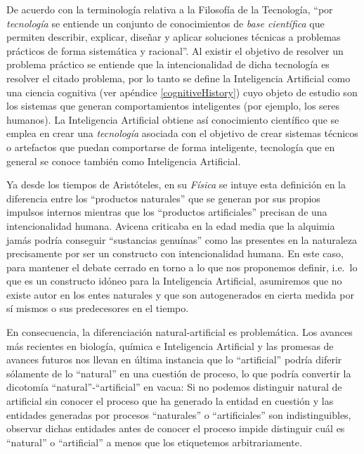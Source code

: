 \documentclass[12pt]{memoir}
\begin{document}
De acuerdo con la terminología relativa a la Filosofía de la Tecnología, ``por \textit{tecnología} se entiende un conjunto de conocimientos de \textit{base científica} que permiten describir, explicar, diseñar y aplicar soluciones técnicas a problemas prácticos de forma sistemática y racional''\parencite[p. 2]{quintanillaRef}. Al existir el objetivo de resolver un problema práctico se entiende que la intencionalidad de dicha tecnología es resolver el citado problema, por lo tanto se define la Inteligencia Artificial como una ciencia cognitiva (ver apéndice \ref{cognitiveHistory}) cuyo objeto de estudio son los sistemas que generan comportamientos inteligentes (por ejemplo, los seres humanos). La Inteligencia Artificial obtiene así conocimiento científico que se emplea en crear una \textit{tecnología} asociada con el objetivo de crear sistemas técnicos o artefactos que puedan comportarse de forma inteligente, tecnología que en general se conoce también como Inteligencia Artificial.

Ya desde los tiempos de Aristóteles, en su \textit{Física} se intuye esta definición en la diferencia entre los ``productos naturales'' que se generan por sus propios impulsos internos mientras que los ``productos artificiales'' precisan de una intencionalidad humana. Avicena criticaba en la edad media que la alquimia jamás podría conseguir ``sustancias genuínas'' como las presentes en la naturaleza precisamente por ser un constructo con intencionalidad humana. En este caso, para mantener el debate cerrado en torno a lo que nos proponemos definir, i.e.\ lo que es un constructo idóneo para la Inteligencia Artificial, asumiremos que no existe autor en los entes naturales y que son autogenerados en cierta medida por sí mismos o sus predecesores en el tiempo.

En consecuencia, la diferenciación natural-artificial es problemática. Los avances más recientes en biología, química e Inteligencia Artificial y las promesas de avances futuros nos llevan en última instancia que lo ``artificial'' podría diferir sólamente de lo ``natural'' en una cuestión de proceso, lo que podría convertir la dicotomía ``natural''-``artificial'' en vacua: Si no podemos distinguir natural de artificial sin conocer el proceso que ha generado la entidad en cuestión y las entidades generadas por procesos ``naturales'' o ``artificiales'' son indistinguibles, observar dichas entidades antes de conocer el proceso impide distinguir cuál es ``natural'' o ``artificial'' a menos que los etiquetemos arbitrariamente. 
\end{document}
